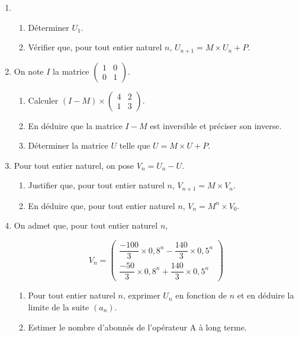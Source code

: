 \documentclass[10pt]{article}
\begin{document}
\begin{enumerate}
\item
  	\begin{enumerate}
  		\item Déterminer $U_1$.
  		\item Vérifier que, pour tout entier naturel $n$, $U_{n+1} = M \times U_n +P$.
  	\end{enumerate}
\item On note $I$ la matrice $
  	\begin{pmatrix}
    1 & 0 \\ 0 & 1
  	\end{pmatrix}$.
  	\begin{enumerate}
  		\item Calculer $(I - M)\times
\begin{pmatrix}
4 & 2 \\ 1 & 3
\end{pmatrix}$.
  		\item En déduire que la matrice $I - M$ est inversible et préciser son inverse.
  		\item Déterminer la matrice $U$ telle que $U = M \times U + P$.
  	\end{enumerate}
\item Pour tout entier naturel, on pose $V_n = U_n - U$.
  	\begin{enumerate}
  		\item Justifier que, pour tout entier naturel $n$, $V_{n+1} = M \times V_n$.
  		\item En déduire que, pour tout entier naturel $n$, $V_n = M^n \times V_0$.
  	\end{enumerate}
\item On admet que, pour tout entier naturel $n$, 

\renewcommand\arraystretch{1.8}
\[V_n =  \begin{pmatrix}
    \dfrac{-100}{3}\times 0,8^n - \dfrac{140}{3} \times 0,5^n \\
    \dfrac{-50}{3} \times 0,8^n + \dfrac{140}{3} \times 0,5^n 
  \end{pmatrix}\]
\renewcommand\arraystretch{1}

  	\begin{enumerate}
  		\item Pour tout entier naturel $n$, exprimer $U_n$ en fonction de $n$ et en déduire la limite de la suite $(a_n)$.
  		\item Estimer le nombre d'abonnés de l'opérateur A à long terme.
  	\end{enumerate}
\end{enumerate}
\end{document}
